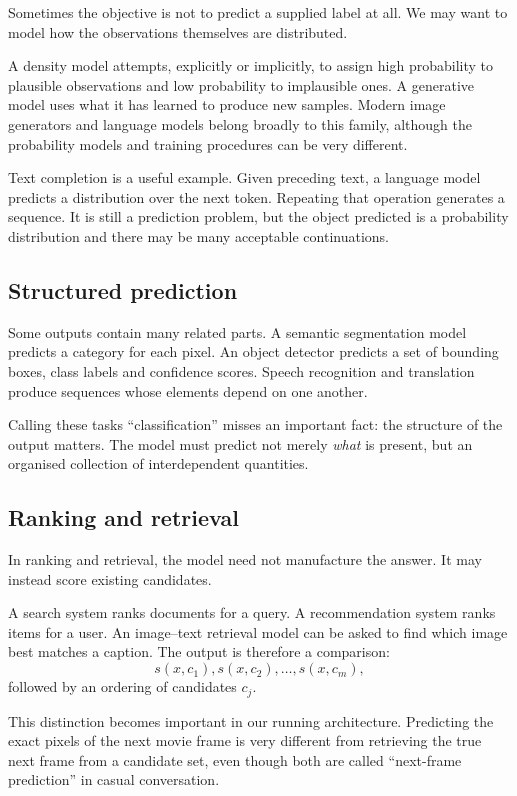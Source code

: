 Sometimes the objective is not to predict a supplied label at all. We may want to model how the observations themselves are distributed.

A density model attempts, explicitly or implicitly, to assign high probability to plausible observations and low probability to implausible ones. A generative model uses what it has learned to produce new samples. Modern image generators and language models belong broadly to this family, although the probability models and training procedures can be very different.

Text completion is a useful example. Given preceding text, a language model predicts a distribution over the next token. Repeating that operation generates a sequence. It is still a prediction problem, but the object predicted is a probability distribution and there may be many acceptable continuations.

\subsection{Structured prediction}

Some outputs contain many related parts. A semantic segmentation model predicts a category for each pixel. An object detector predicts a set of bounding boxes, class labels and confidence scores. Speech recognition and translation produce sequences whose elements depend on one another.

Calling these tasks ``classification'' misses an important fact: the structure of the output matters. The model must predict not merely \emph{what} is present, but an organised collection of interdependent quantities.

\subsection{Ranking and retrieval}

In ranking and retrieval, the model need not manufacture the answer. It may instead score existing candidates.

A search system ranks documents for a query. A recommendation system ranks items for a user. An image--text retrieval model can be asked to find which image best matches a caption. The output is therefore a comparison:
\[
  s(x,c_1), s(x,c_2), \ldots, s(x,c_m),
\]
followed by an ordering of candidates \(c_j\).

This distinction becomes important in our running architecture. Predicting the exact pixels of the next movie frame is very different from retrieving the true next frame from a candidate set, even though both are called ``next-frame prediction'' in casual conversation.

